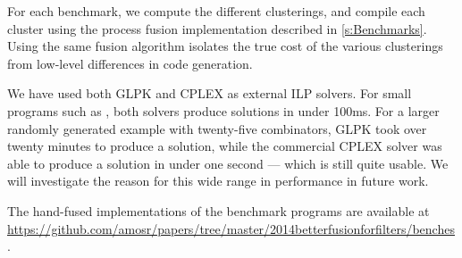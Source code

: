 For each benchmark, we compute the different clusterings, and compile each cluster using the process fusion implementation described in \cref{s:Benchmarks}.
Using the same fusion algorithm isolates the true cost of the various clusterings from low-level differences in code generation.

We have used both GLPK \citep{glpk} and CPLEX \citep{cplex} as external ILP solvers.
For small programs such as \Hs@normalizeInc@, both solvers produce solutions in under 100ms.
For a larger randomly generated example with twenty-five combinators, GLPK took over twenty minutes to produce a solution, while the commercial CPLEX solver was able to produce a solution in under one second --- which is still quite usable.
We will investigate the reason for this wide range in performance in future work.


The hand-fused implementations of the benchmark programs are available at \url{https://github.com/amosr/papers/tree/master/2014betterfusionforfilters/benches}.



